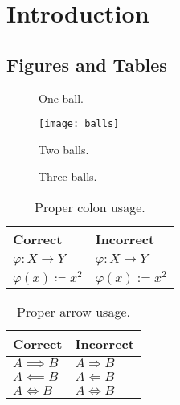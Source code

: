 \chapter{Introduction}
\label{sec:intro}

\kant[4] %

\section{Figures and Tables}

\begin{figure}[htbp]
    \centering
    
    \caption[One ball]{One ball.}
\end{figure}

\begin{figure}[thbp]
    \centering
    \texttt{[image: balls]}
    \caption[Two balls]{Two balls.}
\end{figure}

\begin{figure}[hbp]
    \centering
    \caption[Three balls]{Three balls.}
\end{figure}

\kant[5-6] %

\begin{table}[htbp]
    \centering
    \begin{tabular}{@{}ll@{}}
        \toprule
        \textbf{Correct}               & \textbf{Incorrect}      \\
        \midrule
        \( \varphi \colon X \to Y \)   & \( \varphi : X \to Y \) \\[0.5ex]
        \( \varphi(x) \coloneqq x^2 \) & \( \varphi(x) := x^2 \) \\
        \bottomrule
    \end{tabular}
    \caption[Colons]{Proper colon usage.}
\end{table}

\begin{table}[htbp]
    \centering
    \begin{tabular}{@{}ll@{}}
        \toprule
        \textbf{Correct}     & \textbf{Incorrect}         \\
        \midrule
        \( A \implies B \)   & \( A \Rightarrow B \)      \\
        \( A \impliedby B \) & \( A \Leftarrow B \)       \\
        \( A \iff B \)       & \( A \Leftrightarrow B \)  \\
        \bottomrule
    \end{tabular}
    \caption[Arrows]{Proper arrow usage.}
\end{table}

